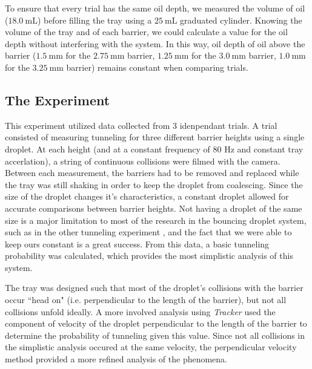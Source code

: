 To ensure that every trial has the same oil depth, we measured the volume of oil ($18.0~\mathrm{mL}$) before filling the tray using a $25~\mathrm{mL}$ graduated cylinder. Knowing the volume of the tray and of each barrier, we could calculate a value for the oil depth without interfering with the system. In this way, oil depth of oil above the barrier ($1.5~\mathrm{mm}$ for the $2.75~\mathrm{mm}$ barrier, $1.25~\mathrm{mm}$ for the $3.0~\mathrm{mm}$ barrier, $1.0~\mathrm{mm}$ for the $3.25~\mathrm{mm}$ barrier) remains constant when comparing trials. 

\subsection{The Experiment}

This experiment utilized data collected from 3 idenpendant trials. A trial consisted of measuring tunneling for three different barrier heights using a single droplet. At each height (and at a constant frequency of 80 Hz and constant tray accerlation), a string of continuous collisions were filmed with the camera. Between each measurement, the barriers had to be removed and replaced while the tray was still shaking in order to keep the droplet from coalescing. Since the size of the droplet changes it's characteristics, a constant droplet allowed for accurate comparisons between barrier heights. Not having a droplet of the same size is a major limitation to most of the research in the bouncing droplet system, such as in the other tunneling experiment \cite{tunneling}, and the fact that we were able to keep ours constant is a great success. From this data, a basic tunneling probability was calculated, which provides the most simplistic analysis of this system. 

The tray was designed such that most of the droplet's collisions with the barrier occur ``head on" (i.e. perpendicular to the length of the barrier), but not all collisions unfold ideally. A more involved analysis using \textit{Tracker} used the component of velocity of the droplet perpendicular to the length of the barrier to determine the probability of tunneling given this value. Since not all collisions in the simplistic analysis occured at the same velocity, the perpendicular velocity method provided a more refined analysis of the phenomena. 
